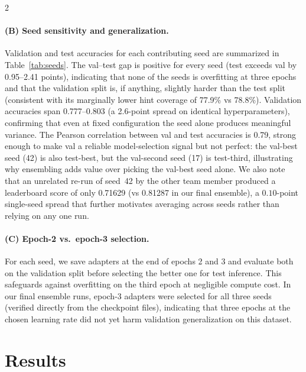 \documentclass[11pt,a4paper]{article}
\begin{document}
\begin{multicols}{2}
\paragraph{(B) Seed sensitivity and generalization.} Validation and test accuracies for each contributing seed are summarized in Table~\ref{tab:seeds}. The val--test gap is positive for every seed (test exceeds val by 0.95--2.41 points), indicating that none of the seeds is overfitting at three epochs and that the validation split is, if anything, slightly harder than the test split (consistent with its marginally lower hint coverage of 77.9\% vs 78.8\%). Validation accuracies span 0.777--0.803 (a 2.6-point spread on identical hyperparameters), confirming that even at fixed configuration the seed alone produces meaningful variance. The Pearson correlation between val and test accuracies is 0.79, strong enough to make val a reliable model-selection signal but not perfect: the val-best seed (42) is also test-best, but the val-second seed (17) is test-third, illustrating why ensembling adds value over picking the val-best seed alone. We also note that an unrelated re-run of seed~42 by the other team member produced a leaderboard score of only 0.71629 (vs 0.81287 in our final ensemble), a $0.10$-point single-seed spread that further motivates averaging across seeds rather than relying on any one run.

\paragraph{(C) Epoch-2 vs.\ epoch-3 selection.} For each seed, we save adapters at the end of epochs 2 and 3 and evaluate both on the validation split before selecting the better one for test inference. This safeguards against overfitting on the third epoch at negligible compute cost. In our final ensemble runs, epoch-3 adapters were selected for all three seeds (verified directly from the checkpoint files), indicating that three epochs at the chosen learning rate did not yet harm validation generalization on this dataset.

\section{Results}


\end{multicols}
\end{document}
